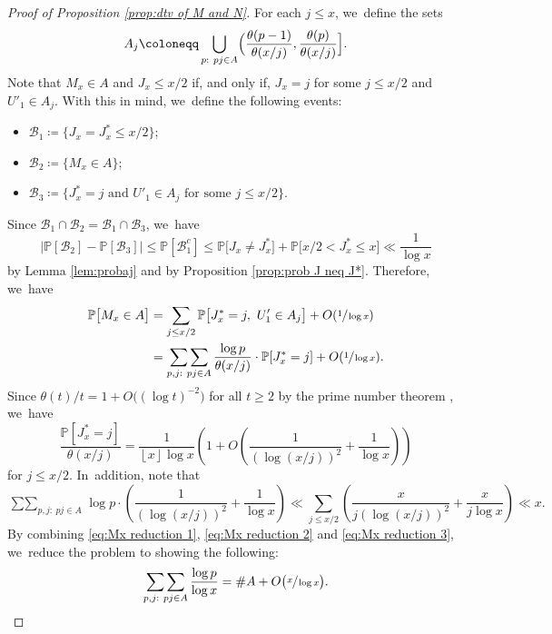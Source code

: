 \documentclass[10pt]{amsart}
\newcommand{\bigO}[1]{O(#1)}
\newcommand{\PP}{\mathbb{P}}
\newcommand{\BC}{\mathcal{B}}
\newcommand{\bigoo}[1]{O\!\left(#1 \right)}
\newcommand{\floor}[1]{\left\lfloor #1 \right\rfloor}
\newcommand{\bg}{\big}
\newcommand{\bgg}{\Big}
\theoremstyle{plain}
\theoremstyle{definition}
\begin{document}
\begin{proof}[Proof of Proposition \ref{prop:dtv of M and N}]
For each $j \le x$, we~define the sets
\[
A_j \coloneqq \bigcup_{\substack{p:\ pj \in A}} \Bigl(\frac{\theta(p-1)}{\theta(x/j)}, \frac{\theta(p)}{\theta(x/j)}\Bigr].
\]
Note that $M_x \in A$ and $J_x \le x/2$ if, and only if, $J_x=j$ for some $j\le x/2$ and $U'_1 \in A_j$. With this in mind, we~define the following events:
\begin{itemize}
\item $\mathcal B_1 \coloneqq \{J_x=J_x^* \le x/2\}$;
\item $\mathcal B_2 \coloneqq \{ M_x \in A\}$;
\item $\mathcal B_3 \coloneqq \{\mbox{$J_x^* = j$ and $U'_1 \in A_j$ for some $j\le x/2$}\}$.
\end{itemize}
Since $\mathcal B_1 \cap \mathcal B_2 = \mathcal B_1 \cap \mathcal B_3$, we~have
\[
\bgg|\PP[\BC_2] - \PP[\BC_3]\bgg| \le \PP[\BC_1^c] \le \PP\bg[J_x \ne J_x^*\bg] + \PP\bg[x/2< J_x^* \le x\bg] \ll \frac{1}{\log x}
\]
by Lemma \ref{lem:probaj} and by Proposition \ref{prop:prob J neq J*}. Therefore, we~have
\begin{equation}
\label{eq:Mx reduction 1}
\begin{aligned}
\PP\bg[M_x \in A\bg]
&= \sum_{j \le x/2} \PP\bg[J_x^* = j,\ U'_1 \in A_j\bg] + \bigO{\sfrac{1}{\log x}} \\
&= \mathop{\sum\sum}_{p,j:\ pj \in A} \frac{\log p}{\theta(x/j)}\cdot \PP[J_x^* = j] + \bigO{\sfrac{1}{\log x}}.
\end{aligned}
\end{equation}
Since $\theta(t)/t = 1 + O\bg((\log t)^{-2}\bg)$ for all $t \ge 2$ by the prime number theorem \cite[Th.\,8.1]{Koukoulo19}, we~have
\begin{equation}
\label{eq:Mx reduction 2}
\frac{\PP[J_x^* = j]}{\theta(x/j)} = \frac{1}{\floor x \log x}\left(1+\bigoo{\frac{1}{(\log(x/j))^2}+\frac{1}{\log x}}\right)
\end{equation}
for $j\le x/2$. In~addition, note that
\begin{equation}
\label{eq:Mx reduction 3}
\mathop{\sum\sum}_{p,j:\ pj \in A} \log p \cdot \left(\frac{1}{(\log(x/j))^2} + \frac{1}{\log x}\right) \ll \sum_{j \le x/2} \left(\frac{x}{j(\log(x/j))^2} + \frac{x}{j\log x}\right) \ll x.
\end{equation}
By combining \eqref{eq:Mx reduction 1}, \eqref{eq:Mx reduction 2} and \eqref{eq:Mx reduction 3}, we~reduce the problem to showing the following:
\begin{equation}
\label{eq:Mx reduction 4}
\mathop{\sum\sum}_{p,j:\ pj \in A} \frac{\log p}{\log x} = \# A + O\bg(\sfrac{x}{\log x}\bg).

\end{equation}
\end{proof}
\end{document}
